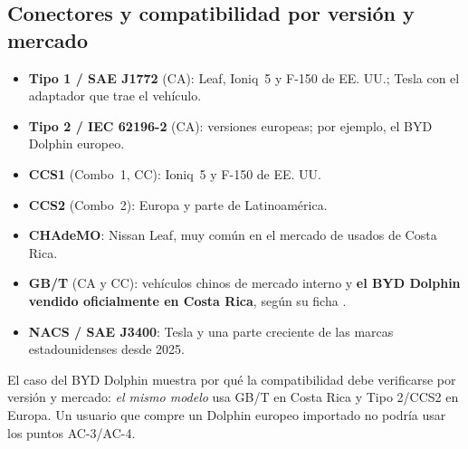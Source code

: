 \subsection{Conectores y compatibilidad por versión y mercado}
\label{sec:compat}
\begin{itemize}
\item \textbf{Tipo 1 / SAE J1772} (CA): Leaf, Ioniq~5 y F-150 de EE. UU.; Tesla con el adaptador que trae el vehículo.
\item \textbf{Tipo 2 / IEC 62196-2} (CA): versiones europeas; por ejemplo, el BYD Dolphin europeo.
\item \textbf{CCS1} (Combo~1, CC): Ioniq~5 y F-150 de EE. UU.
\item \textbf{CCS2} (Combo~2): Europa y parte de Latinoamérica.
\item \textbf{CHAdeMO}: Nissan Leaf, muy común en el mercado de usados de Costa Rica.
\item \textbf{GB/T} (CA y CC): vehículos chinos de mercado interno y \textbf{el BYD Dolphin vendido oficialmente en Costa Rica}, según su ficha \cite{bydDolphin}.
\item \textbf{NACS / SAE J3400}: Tesla y una parte creciente de las marcas estadounidenses desde 2025.
\end{itemize}
El caso del BYD Dolphin muestra por qué la compatibilidad debe verificarse por versión y mercado: \emph{el mismo modelo} usa GB/T en Costa Rica y Tipo 2/CCS2 en Europa. Un usuario que compre un Dolphin europeo importado no podría usar los puntos AC-3/AC-4.

